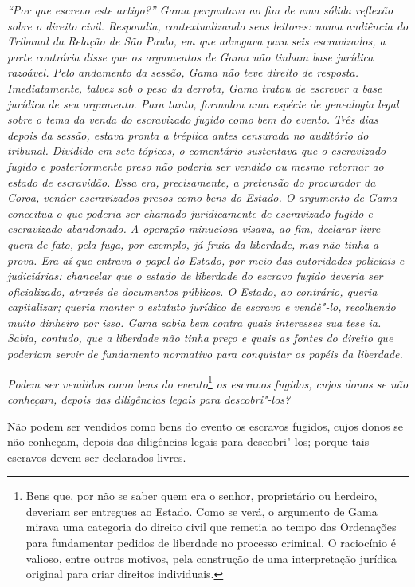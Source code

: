 \begin{flushleft}
{\footnotesize\itshape
``Por que escrevo este artigo?''
Gama perguntava ao fim de uma sólida reflexão sobre o direito civil.
Respondia, contextualizando seus leitores: numa audiência do
Tribunal da Relação de São Paulo, em que advogava para seis
escravizados, a parte contrária disse que os argumentos de Gama não tinham base
jurídica razoável. Pelo andamento da sessão, Gama não teve direito de
resposta. Imediatamente, talvez sob o peso da derrota, Gama tratou de
escrever a base jurídica de seu argumento. Para tanto, formulou uma
espécie de genealogia legal sobre o tema da venda do escravizado fugido
como bem do evento. Três dias depois da sessão, estava pronta a tréplica
antes censurada no auditório do tribunal. Dividido em sete tópicos,
o comentário sustentava
que o escravizado fugido e posteriormente preso não poderia ser vendido
ou mesmo retornar ao estado de escravidão. Essa era,
precisamente, a pretensão do procurador da Coroa, vender escravizados
presos como bens do Estado. O argumento de Gama conceitua o que poderia
ser chamado juridicamente de escravizado fugido e escravizado
abandonado. A operação minuciosa visava, ao fim, declarar livre quem de
fato, pela fuga, por exemplo, já fruía da liberdade,
mas não tinha a prova. Era aí que
entrava o papel do Estado, por meio das autoridades policiais e
judiciárias: chancelar que o
estado de liberdade do escravo fugido deveria ser oficializado, através de documentos
públicos. O Estado, ao contrário, queria capitalizar; queria manter o
estatuto jurídico de escravo e vendê"-lo,
recolhendo muito dinheiro por isso. Gama sabia bem contra quais
interesses sua tese ia. Sabia, contudo, que a liberdade não tinha preço
e quais as fontes do direito que poderiam servir de fundamento normativo
para conquistar os papéis da liberdade.}
\end{flushleft}


\noindent\emph{Podem ser vendidos como bens do evento}\footnote{Bens que, por
  não se saber quem era o senhor, proprietário ou herdeiro, deveriam ser
  entregues ao Estado. Como se verá, o argumento de Gama mirava uma
  categoria do direito civil que remetia ao tempo das Ordenações para
  fundamentar pedidos de liberdade no processo criminal. O raciocínio é
  valioso, entre outros motivos, pela construção de uma interpretação
  jurídica original para criar direitos individuais.} \emph{os escravos
fugidos, cujos donos se não conheçam, depois das diligências legais para
descobri"-los?}

Não podem ser vendidos como bens do evento os escravos fugidos, cujos
donos se não conheçam, depois das diligências legais para descobri"-los;
porque tais escravos devem ser declarados livres.

